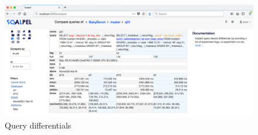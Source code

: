 \documentclass{cidr-2019}
\begin{document}
\begin{figure}[t!]
\centering
\includegraphics[width=\textwidth]{Figures/compare2.png}
\caption{Query differentials
	\label{fig:differential}}
\end{figure}












\end{document}
